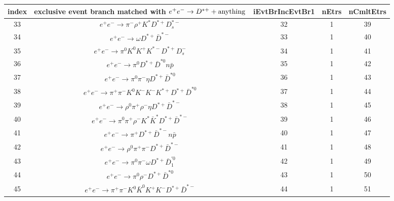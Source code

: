 \documentclass[landscape]{article}
\begin{document}
\begin{table}[htbp!]
\small
\centering
\begin{tabular}{|c|c|c|c|c|}
\hline
index & exclusive event branch matched with $ e^{+} e^{-} \rightarrow D^{*+} + \rm{anything} $ & iEvtBrIncEvtBr1 & nEtrs & nCmltEtrs \\
\hline
33 & $ e^{+} e^{-} \rightarrow \pi^{-} \rho^{+} K^{*} D^{*+} D_{s}^{*-} $ & 32 & 1 & 39 \\
\hline
34 & $ e^{+} e^{-} \rightarrow \omega D^{*+} \bar{D}^{*-} $ & 33 & 1 & 40 \\
\hline
35 & $ e^{+} e^{-} \rightarrow \pi^{0} K^{0} K^{+} K^{*-} D^{*+} D_{s}^{-} $ & 34 & 1 & 41 \\
\hline
36 & $ e^{+} e^{-} \rightarrow \pi^{0} D^{*+} \bar{D}^{*0} n \bar{p} $ & 35 & 1 & 42 \\
\hline
37 & $ e^{+} e^{-} \rightarrow \pi^{0} \pi^{-} \eta D^{*+} \bar{D}^{*0} $ & 36 & 1 & 43 \\
\hline
38 & $ e^{+} e^{-} \rightarrow \pi^{+} \pi^{-} K^{0} K^{-} K^{-} K^{*+} D^{*+} \bar{D}^{*0} $ & 37 & 1 & 44 \\
\hline
39 & $ e^{+} e^{-} \rightarrow \rho^{0} \pi^{+} \rho^{-} \eta D^{*+} \bar{D}^{*-} $ & 38 & 1 & 45 \\
\hline
40 & $ e^{+} e^{-} \rightarrow \pi^{0} \pi^{+} \rho^{-} K^{*} \bar{K}^{*} D^{*+} \bar{D}^{*-} $ & 39 & 1 & 46 \\
\hline
41 & $ e^{+} e^{-} \rightarrow \pi^{+} D^{*+} \bar{D}^{*-} n \bar{p} $ & 40 & 1 & 47 \\
\hline
42 & $ e^{+} e^{-} \rightarrow \rho^{0} \pi^{+} \pi^{-} D^{*+} \bar{D}^{*-} $ & 41 & 1 & 48 \\
\hline
43 & $ e^{+} e^{-} \rightarrow \pi^{0} \pi^{-} \omega D^{*+} \bar{D}_{1}^{\prime0} $ & 42 & 1 & 49 \\
\hline
44 & $ e^{+} e^{-} \rightarrow \pi^{0} \rho^{-} D^{*+} \bar{D}^{*0} $ & 43 & 1 & 50 \\
\hline
45 & $ e^{+} e^{-} \rightarrow \pi^{+} \pi^{-} K^{0} \bar{K}^{0} K^{+} K^{-} D^{*+} \bar{D}^{*-} $ & 44 & 1 & 51 \\
\hline
\end{tabular}
\end{table}
\end{document}
